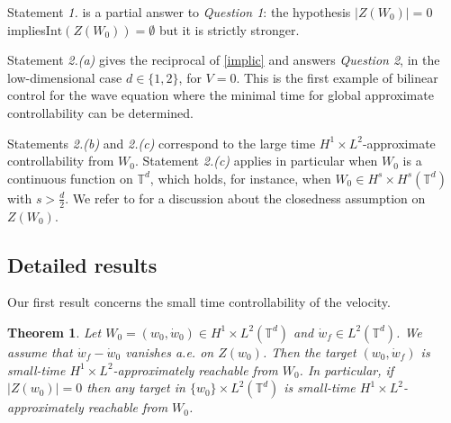 \documentclass[a4paper]{article}
\theoremstyle{plain}
\newtheorem{theorem}{Theorem}
\newcommand{\T}{\mathbb{T}}
\newcommand{\R}{\mathbb{R}}
\begin{document}
Statement \emph{1.} is a partial answer to \emph{Question 1}: the hypothesis $|Z(W_0)|=0$ implies\newline$\text{Int}\left( Z(W_0) \right) = \emptyset$ but it is strictly stronger. 

Statement \emph{2.(a)} gives the reciprocal of \eqref{implic} and answers \emph{Question 2}, in the low-dimensional case $d\in\{1,2\}$, for $V=0$. This is the first example of bilinear control for the wave equation where the minimal time for global approximate controllability can be determined.

Statements \emph{2.(b)} and \emph{2.(c)} correspond to the large time $H^1 \times L^2$-approximate controllability from $W_0$. Statement  \emph{2.(c)} applies in particular when $W_0$ is a continuous function on $\T^d$, which holds, for instance, when $W_0 \in H^{s} \times H^s (\T^d)$ with $s>\frac{d}{2}$.
We refer to  for a discussion about the closedness assumption on $Z(W_0)$.







\subsection{Detailed results}

Our first result concerns the small time controllability of the velocity.

\begin{theorem} \label{Prop:STAC_vel}
Let $W_0=(w_0,\dot{w}_0)\in H^1 \times  L^2(\T^d)$ and $\dot{w}_f \in L^2(\T^d)$. We assume that $\dot{w}_f-\dot{w}_0$ vanishes a.e. on $Z(w_0)$. Then the target $(w_0,\dot{w}_f)$ is small-time 
$H^1 \times L^2$-approximately reachable from $W_0$.
In particular, if $|Z(w_0)|=0$ then any target in $\{w_0\} \times  L^2(\T^d)$ is small-time $H^1 \times L^2$-approximately reachable from $W_0$.



\end{theorem}
\end{document}
